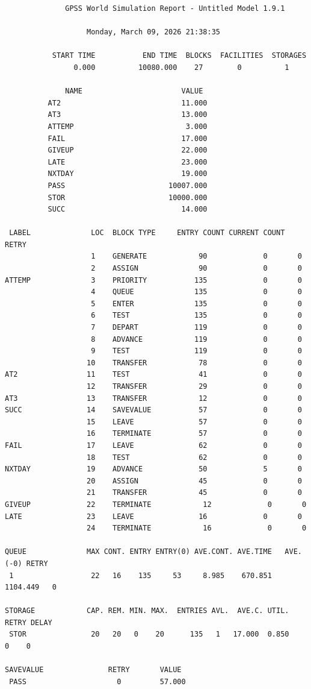 \documentclass[a4paper, 14pt]{extarticle}
\begin{document}
\begin{lstlisting}
              GPSS World Simulation Report - Untitled Model 1.9.1

                   Monday, March 09, 2026 21:38:35  

           START TIME           END TIME  BLOCKS  FACILITIES  STORAGES
                0.000          10080.000    27        0          1

              NAME                       VALUE  
          AT2                            11.000
          AT3                            13.000
          ATTEMP                          3.000
          FAIL                           17.000
          GIVEUP                         22.000
          LATE                           23.000
          NXTDAY                         19.000
          PASS                        10007.000
          STOR                        10000.000
          SUCC                           14.000

 LABEL              LOC  BLOCK TYPE     ENTRY COUNT CURRENT COUNT RETRY
                    1    GENERATE            90             0       0
                    2    ASSIGN              90             0       0
ATTEMP              3    PRIORITY           135             0       0
                    4    QUEUE              135             0       0
                    5    ENTER              135             0       0
                    6    TEST               135             0       0
                    7    DEPART             119             0       0
                    8    ADVANCE            119             0       0
                    9    TEST               119             0       0
                   10    TRANSFER            78             0       0
AT2                11    TEST                41             0       0
                   12    TRANSFER            29             0       0
AT3                13    TRANSFER            12             0       0
SUCC               14    SAVEVALUE           57             0       0
                   15    LEAVE               57             0       0
                   16    TERMINATE           57             0       0
FAIL               17    LEAVE               62             0       0
                   18    TEST                62             0       0
NXTDAY             19    ADVANCE             50             5       0
                   20    ASSIGN              45             0       0
                   21    TRANSFER            45             0       0
GIVEUP             22    TERMINATE            12             0       0
LATE               23    LEAVE               16             0       0
                   24    TERMINATE            16             0       0

QUEUE              MAX CONT. ENTRY ENTRY(0) AVE.CONT. AVE.TIME   AVE.(-0) RETRY
 1                  22   16    135     53     8.985    670.851   1104.449   0

STORAGE            CAP. REM. MIN. MAX.  ENTRIES AVL.  AVE.C. UTIL. RETRY DELAY
 STOR               20   20   0    20      135   1   17.000  0.850    0    0

SAVEVALUE               RETRY       VALUE
 PASS                     0         57.000
\end{lstlisting}
\end{document}
